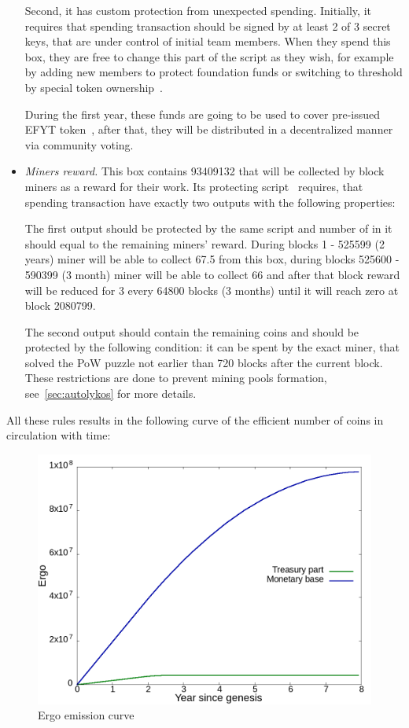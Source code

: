 \begin{itemize}
    Second, it has custom protection from unexpected spending.
    Initially, it requires that spending transaction should be signed by at least 2 of 3 secret keys,
    that are under control of initial team members. When they spend this box, they are free to
    change this part of the script as they wish, for example by adding new members to protect foundation
    funds or switching to threshold by special token ownership~\cite{link to ...}.

    During the first year, these funds are going to be used to cover pre-issued EFYT token~\cite{our website},
    after that, they will be distributed in a decentralized manner via community voting.


    \item{\em Miners reward.} This box contains 93409132 \Erg{} that will be collected by block miners
    as a reward for their work.
    Its protecting script~\cite{link to corresponding ergo tree} requires, that spending transaction
    have exactly two outputs with the following properties:


    The first output should be protected by the same script and number of \Erg{} in it should
    equal to the remaining miners' reward.
    During blocks 1 - 525599 (2 years) miner will be able to collect 67.5 \Erg{} from this box,
    during blocks 525600 - 590399 (3 month) miner will be able to collect 66 \Erg{} and after
    that block reward will be reduced for 3 \Erg{} every 64800 blocks (3 months) until it will reach zero
    at block 2080799.

    The second output should contain the remaining coins and should be protected by the following condition:
    it can be spent by the exact miner, that solved the PoW puzzle not earlier than 720 blocks after the current block.
    These restrictions are done to prevent mining pools formation, see~\ref{sec:autolykos} for more details.



\end{itemize}

All these rules results in the following curve of the efficient number of coins in circulation with time:

\begin{figure}[H]
    \centering
    \includegraphics[width=\textwidth]{img/emission.png}
    \caption{Ergo emission curve
    \label{fig:emission} }
\end{figure}
